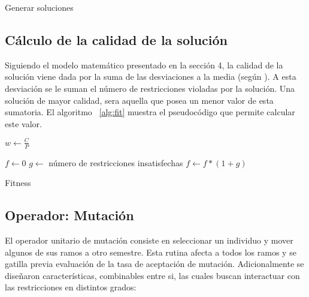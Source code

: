 \documentclass[letter, 10pt]{article}
\begin{document}
\begin{algorithm}[H]
\SetLine
{}
\caption{Generar soluciones}
\label{alg:gennew}
\end{algorithm}

\subsection{Cálculo de la calidad de la solución}
Siguiendo el modelo matemático presentado en la sección 4, la calidad
de la solución viene dada por la suma de las desviaciones a la media
(según \cite{schaus2007deviation}).  A esta desviación se le suman el
número de restricciones violadas por la solución. Una solución de
mayor calidad, sera aquella que posea un menor valor de esta
sumatoria. El algoritmo ~\ref{alg:fit} muestra el pseudocódigo que
permite calcular este valor.

\begin{algorithm}[H]
\SetLine
{}
$w \gets \frac{C}{P}$

$f \gets 0$ \;
$g \gets$ número de restricciones insatisfechas \;
$f \gets f * (1+g)$ \;


\caption{Fitness}
\label{alg:fit}
\end{algorithm}


\subsection{Operador: Mutación}
El operador unitario de mutación consiste en seleccionar un individuo
y mover algunos de sus ramos a otro semestre.  Esta rutina afecta a
todos los ramos y se gatilla previa evaluación de la tasa de
aceptación de mutación.  Adicionalmente se diseñaron características,
combinables entre si, las cuales buscan interactuar con las
restricciones en distintos grados:
\end{document}
